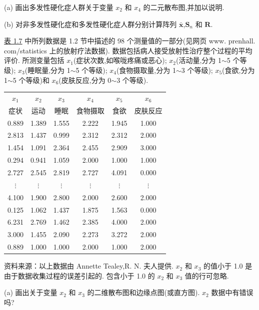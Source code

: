 
(a) 画出多发性硬化症人群关于变量 $x_2$ 和 $x_4$ 的二元散布图,并加以说明.

(b) 对非多发性硬化症和多发性硬化症人群分别计算阵列 $\bar{\bm{x}}$,$\bm{S}_n$ 和 $\bm{R}$.

 \hyperref[tab:1.7]{表 1.7} 中所列数据是 1.2 节中描述的 98 个测量值的一部分(见网页 www. prenhall. com/statistics 上的放射疗法数据). 数据包括病人接受放射性治疗整个过程的平均评价. 所测变量包括 $x_1$(症状次数,如喉咙疼痛或恶心); $x_2$(活动量,分为 1$\sim$5 个等级); $x_3$(睡眠量,分为 1$\sim$5 个等级); $x_4$(食物摄取量,分为 1$\sim$3 个等级); $x_5$(食欲,分为 1$\sim$5 个等级)和 $x_6$(皮肤反应,分为 0$\sim$3 个等级).

\begin{mvtable}
\label{tab:1.7}
\begin{tabular}{cccccc}
\toprule
$x_1$ & $x_2$ & $x_3$ & $x_4$ & $x_5$ & $x_6$ \\
症状 & 运动 & 睡眠 & 食物摄取 & 食欲 & 皮肤反应 \\
\midrule
0.889 & 1.389 & 1.555 & 2.222 & 1.945 & 1.000 \\
2.813 & 1.437 & 0.999 & 2.312 & 2.312 & 2.000 \\
1.454 & 1.091 & 2.364 & 2.455 & 2.909 & 3.000 \\
0.294 & 0.941 & 1.059 & 2.000 & 1.000 & 1.000 \\
2.727 & 2.545 & 2.819 & 2.727 & 4.091 & 0.000 \\
$\vdots$ & $\vdots$ & $\vdots$ & $\vdots$ & $\vdots$ & $\vdots$ \\
4.100 & 1.900 & 2.800 & 2.000 & 2.600 & 2.000 \\
0.125 & 1.062 & 1.437 & 1.875 & 1.563 & 0.000 \\
6.231 & 2.769 & 1.462 & 2.385 & 4.000 & 2.000 \\
3.000 & 1.455 & 2.090 & 2.273 & 3.272 & 2.000 \\
0.889 & 1.000 & 1.000 & 2.000 & 1.000 & 2.000 \\
\bottomrule
\end{tabular}
\end{mvtable}

{ 资料来源：以上数据由 Annette Tealey,R. N. 夫人提供. $x_2$ 和 $x_3$ 的值小于 1.0 是由于数据收集过程的误差引起的. 包含小于 1.0 的 $x_2$ 和 $x_3$ 值的行可忽略.}

(a) 画出关于变量 $x_2$ 和 $x_3$ 的二维散布图和边缘点图(或直方图). $x_2$ 数据中有错误吗?

